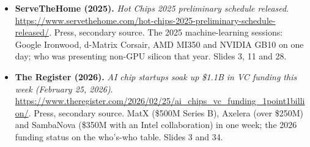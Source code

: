 \documentclass[11pt,letterpaper]{article}
\begin{document}
\begin{itemize}[leftmargin=1.2em,itemsep=3pt]
\item \textbf{ServeTheHome (2025).} \textit{Hot Chips 2025 preliminary schedule released}. \url{https://www.servethehome.com/hot-chips-2025-preliminary-schedule-released/}. Press, secondary source. The 2025 machine-learning sessions: Google Ironwood, d-Matrix Corsair, AMD MI350 and NVIDIA GB10 on one day; who was presenting non-GPU silicon that year. Slides 3, 11 and 28.
\item \textbf{The Register (2026).} \textit{AI chip startups soak up \$1.1B in VC funding this week (February 25, 2026)}. \url{https://www.theregister.com/2026/02/25/ai_chips_vc_funding_1point1billion/}. Press, secondary source. MatX (\$500M Series B), Axelera (over \$250M) and SambaNova (\$350M with an Intel collaboration) in one week; the 2026 funding status on the who's-who table. Slides 3 and 34.
\end{itemize}
\end{document}
